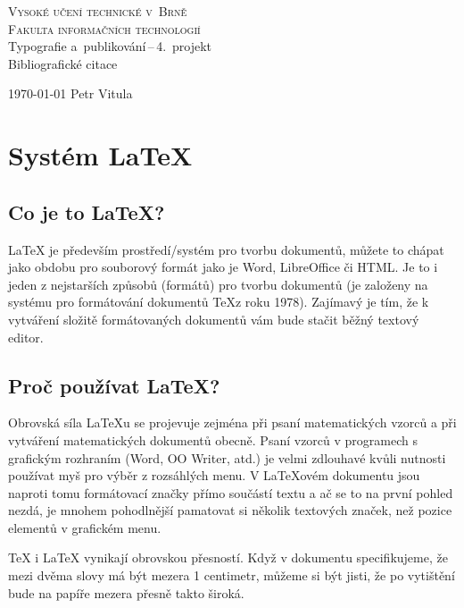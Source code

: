 \documentclass[a4paper, 11pt]{article}
\begin{document}
\begin{titlepage}
        \begin{center}
            \Huge
			\textsc{Vysoké učení technické v~Brně} \\
			\huge
			\textsc{Fakulta informačních technologií} \\
			\LARGE
			Typografie a~publikování\,--\,4.~projekt \\
			\Huge
			Bibliografické citace
		\end{center}

		{\Large
			\today
			\hfill
			Petr Vitula
		}
\end{titlepage}

\section{Systém \LaTeX}

\subsection{Co je to \LaTeX ?}

\LaTeX{} je především prostředí/systém pro tvorbu dokumentů, můžete to chápat jako obdobu pro souborový formát jako je Word, LibreOffice či HTML. Je to i jeden z nejstarších způsobů (formátů) pro tvorbu dokumentů (je založeny na systému pro formátování dokumentů \TeX z roku 1978). Zajímavý je tím, že k vytváření složitě formátovaných dokumentů vám bude stačit běžný textový editor.\cite{365tipu2018}


\subsection{Proč používat \LaTeX ?}

Obrovská síla \LaTeX u se projevuje zejména při psaní matematických vzorců a při vytváření matematických dokumentů obecně. Psaní vzorců v programech s grafickým rozhraním (Word, OO Writer, atd.) je velmi zdlouhavé kvůli nutnosti používat myš pro výběr z rozsáhlých menu. V LaTeXovém dokumentu jsou naproti tomu formátovací značky přímo součástí textu a ač se to na první pohled nezdá, je mnohem pohodlnější pamatovat si několik textových značek, než pozice elementů v grafickém menu.

TeX i LaTeX vynikají obrovskou přesností. Když v dokumentu specifikujeme, že mezi dvěma slovy má být mezera 1 centimetr, můžeme si být jisti, že po vytištění bude na papíře mezera přesně takto široká.
\end{document}
